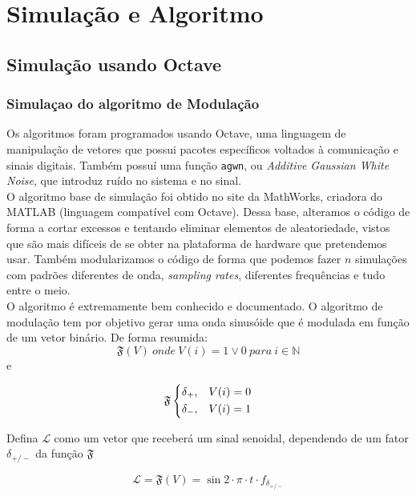 \documentclass[11pt,a4paper]{report}
\begin{document}
\chapter{Simulação e Algoritmo}
	\section{Simulação usando Octave}
		\subsection{Simulaçao do algoritmo de Modulação}
	
	Os algoritmos foram programados usando Octave, uma linguagem de manipulação de vetores que possui pacotes específicos voltados à comunicação e sinais digitais. Também possuí uma função \texttt{agwn}, ou {\it Additive Gaussian White Noise}, que introduz ruído no sistema e no sinal.\\
	
	O algoritmo base de simulação foi obtido no site da MathWorks, criadora do MATLAB (linguagem compatível com Octave). Dessa base, alteramos o código de forma a cortar excessos e tentando eliminar elementos de aleatoriedade, vistos que são mais difíceis de se obter na plataforma de hardware que pretendemos usar. Também modularizamos o código de forma que podemos fazer $n$ simulações com padrões diferentes de onda, {\it sampling rates}, diferentes frequências e tudo entre o meio.\\
	
	O algoritmo é extremamente bem conhecido e documentado. O algoritmo de modulação tem por objetivo gerar uma onda sinusóide que é modulada em função de um vetor binário. De forma resumida:
	\begin{equation}
	\mathfrak{F}(V)\ onde\ V(i) = 1 \lor 0\ para\ i \in \mathbb{N}
	\end{equation}
	e

	\[
	\mathfrak{F}
	\begin{dcases}
	\delta_{+}, & V(i) = 0 \\
	\delta_{-}, & V(i) = 1 \\
	\end{dcases}
	\]


	Defina $\mathcal{L}$ como um vetor que receberá um sinal senoidal, dependendo de um fator $\delta_{+/-}$ da função $\mathfrak{F}$

	\begin{equation}
	\mathcal{L} = \mathfrak{F}(V) = \sin{2 \cdot \pi \cdot t \cdot f_{\delta_{+/-}}}
	\end{equation}
	
\end{document}
